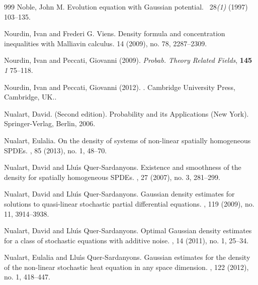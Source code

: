 \documentclass[a4paper,12pt]{article}
\theoremstyle{plain}
\theoremstyle{definition}
\begin{document}
\begin{thebibliography}{999}
Noble, John M.
\newblock Evolution equation with Gaussian potential.
\ 28{\it (1)} (1997) 103--135.

Nourdin, Ivan and Frederi G. Viens.
\newblock Density formula and concentration inequalities with Malliavin calculus. 
 14 (2009), no. 78, 2287--2309.

Nourdin, Ivan and Peccati, Giovanni (2009).
\newblock \emph{ Probab. Theory Related Fields}, {\bf 145} {\it 1} 75--118.
        
Nourdin, Ivan  and Peccati, Giovanni (2012).
.
\newblock Cambridge University Press, Cambridge, UK..
       
Nualart, David.
 (Second edition).
\newblock Probability and its Applications (New York). Springer-Verlag, Berlin, 2006.

Nualart, Eulalia.
\newblock On the density of systems of non-linear spatially homogeneous {SPDEs}.
, 85 (2013), no. 1, 48--70.


Nualart, David and Llu{\'{\i}}s Quer-Sardanyons.
\newblock Existence and smoothness of the density for spatially homogeneous {SPDE}s.
, 27 (2007), no. 3, 281--299. 

Nualart, David and Llu{\'{\i}}s Quer-Sardanyons.
\newblock Gaussian density estimates for solutions to quasi-linear stochastic partial differential equations.
, 119 (2009), no. 11, 3914--3938.


Nualart, David and Llu{\'{\i}}s Quer-Sardanyons.
\newblock Optimal Gaussian density estimates for a class of stochastic equations with additive noise.
, 14 (2011), no. 1, 25--34.
  
Nualart, Eulalia and  Llu{\'{\i}}s Quer-Sardanyons.
\newblock Gaussian estimates for the density of the non-linear stochastic heat equation in any space dimension. 
, 122 (2012), no. 1, 418--447.


\end{thebibliography}
\end{document}
